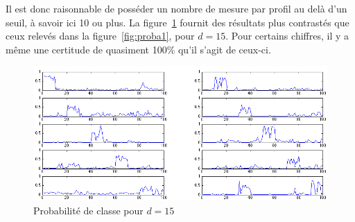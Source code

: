 Il est donc raisonnable de posséder un nombre de mesure par profil au delà d'un seuil, à savoir ici 10 ou plus. La figure~\ref{fig:proba1d} fournit des résultats plus contrastés que ceux relevés dans la figure~\ref{fig:proba1}, pour $d = 15$. Pour certains chiffres, il y a même une certitude de quasiment 100\% qu'il s'agit de ceux-ci.

\begin{figure}[hm]
	\begin{center}
		\includegraphics[width=\textwidth]{img/23-pbelonging1-influence-d.png}
	\end{center}
	\caption{Probabilité de classe pour $d = 15$}
	\label{fig:proba1d}
\end{figure}
